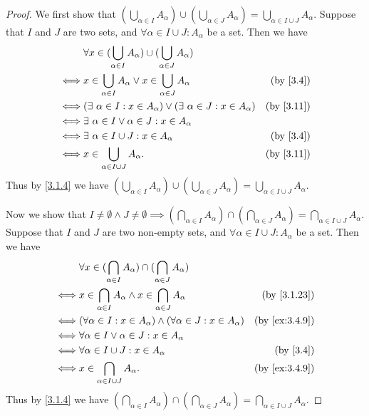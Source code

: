 \begin{proof}
  We first show that \((\bigcup_{\alpha \in I} A_{\alpha}) \cup (\bigcup_{\alpha \in J} A_{\alpha}) = \bigcup_{\alpha \in I \cup J} A_{\alpha}\).
  Suppose that \(I\) and \(J\) are two sets, and \(\forall \alpha \in I \cup J : A_{\alpha}\) be a set.
  Then we have
  \begin{align*}
         & \forall x \in (\bigcup_{\alpha \in I} A_{\alpha}) \cup (\bigcup_{\alpha \in J} A_{\alpha})                           \\
    \iff & x \in \bigcup_{\alpha \in I} A_{\alpha} \lor x \in \bigcup_{\alpha \in J} A_{\alpha}       & \text{(by \cref{3.4})}  \\
    \iff & (\exists\ \alpha \in I : x \in A_{\alpha}) \lor (\exists\ \alpha \in J : x \in A_{\alpha}) & \text{(by \cref{3.11})} \\
    \iff & \exists\ \alpha \in I \lor \alpha \in J : x \in A_{\alpha}                                                           \\
    \iff & \exists\ \alpha \in I \cup J : x \in A_{\alpha}                                            & \text{(by \cref{3.4})}  \\
    \iff & x \in \bigcup_{\alpha \in I \cup J} A_{\alpha}.                                            & \text{(by \cref{3.11})}
  \end{align*}
  Thus by \cref{3.1.4} we have \((\bigcup_{\alpha \in I} A_{\alpha}) \cup (\bigcup_{\alpha \in J} A_{\alpha}) = \bigcup_{\alpha \in I \cup J} A_{\alpha}\).

  Now we show that \(I \neq \emptyset \land J \neq \emptyset \implies (\bigcap_{\alpha \in I} A_{\alpha}) \cap (\bigcap_{\alpha \in J} A_{\alpha}) = \bigcap_{\alpha \in I \cup J} A_{\alpha}\).
  Suppose that \(I\) and \(J\) are two non-empty sets, and \(\forall \alpha \in I \cup J : A_{\alpha}\) be a set.
  Then we have
  \begin{align*}
         & \forall x \in (\bigcap_{\alpha \in I} A_{\alpha}) \cap (\bigcap_{\alpha \in J} A_{\alpha})                               \\
    \iff & x \in \bigcap_{\alpha \in I} A_{\alpha} \land x \in \bigcap_{\alpha \in J} A_{\alpha}      & \text{(by \cref{3.1.23})}   \\
    \iff & (\forall \alpha \in I : x \in A_{\alpha}) \land (\forall \alpha \in J : x \in A_{\alpha})  & \text{(by \cref{ex:3.4.9})} \\
    \iff & \forall \alpha \in I \lor \alpha \in J : x \in A_{\alpha}                                                                \\
    \iff & \forall \alpha \in I \cup J : x \in A_{\alpha}                                             & \text{(by \cref{3.4})}      \\
    \iff & x \in \bigcap_{\alpha \in I \cup J} A_{\alpha}.                                            & \text{(by \cref{ex:3.4.9})}
  \end{align*}
  Thus by \cref{3.1.4} we have \((\bigcap_{\alpha \in I} A_{\alpha}) \cap (\bigcap_{\alpha \in J} A_{\alpha}) = \bigcap_{\alpha \in I \cup J} A_{\alpha}\).
\end{proof}

